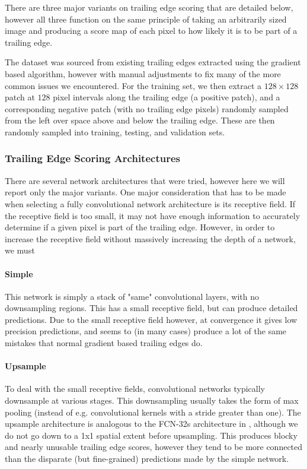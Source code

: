 There are three major variants on trailing edge scoring that are detailed below, however all three function on the same principle of taking an arbitrarily sized image and producing a score map of each pixel to how likely it is to be part of a trailing edge.

The dataset was sourced from existing trailing edges extracted using the gradient based algorithm, however with manual adjustments to fix many of the more common issues we encountered.
For the training set, we then extract a $128 \times 128$ patch at $128$ pixel intervals along the trailing edge (a positive patch), and a corresponding negative patch (with no trailing edge pixels) randomly sampled from the left over space above and below the trailing edge.
These are then randomly sampled into training, testing, and validation sets.

\subsubsection{Trailing Edge Scoring Architectures}

There are several network architectures that were tried, however here we will report only the major variants.
One major consideration that has to be made when selecting a fully convolutional network architecture is its receptive field.
If the receptive field is too small, it may not have enough information to accurately determine if a given pixel is part of the trailing edge.
However, in order to increase the receptive field without massively increasing the depth of a network, we must 

\paragraph{Simple}
This network is simply a stack of "same" convolutional layers, with no downsampling regions.
This has a small receptive field, but can produce detailed predictions.
Due to the small receptive field however, at convergence it gives low precision predictions, and seems to (in many cases) produce a lot of the same mistakes that normal gradient based trailing edges do.

\paragraph{Upsample}
To deal with the small receptive fields, convolutional networks typically downsample at various stages. 
This downsampling usually takes the form of max pooling (instead of e.g. convolutional kernels with a stride greater than one).
The upsample architecture is analogous to the FCN-32s architecture in \cite{long2015fully}, although we do not go down to a 1x1 spatial extent before upsampling.
This produces blocky and nearly unusable trailing edge scores, however they tend to be more connected than the disparate (but fine-grained) predictions made by the simple network.

